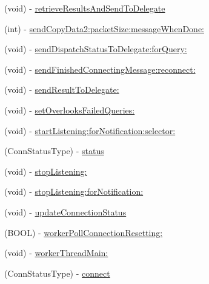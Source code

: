 \begin{DoxyCompactItemize}
\item 
(void) -\/ \hyperlink{interface_p_g_t_s_connection_a57a45776d9bde345c877f7126bf8d52d}{retrieve\+Results\+And\+Send\+To\+Delegate}
\item 
(int) -\/ \hyperlink{interface_p_g_t_s_connection_a4a7d18e07e3280f24111c371e435d9ab}{send\+Copy\+Data2\+:packet\+Size\+:message\+When\+Done\+:}
\item 
(void) -\/ \hyperlink{interface_p_g_t_s_connection_a51eb82fa2ff80b9cf0f1886b0ee5070b}{send\+Dispatch\+Status\+To\+Delegate\+:for\+Query\+:}
\item 
(void) -\/ \hyperlink{interface_p_g_t_s_connection_a05622f7428508a50ad60ca55337dbe06}{send\+Finished\+Connecting\+Message\+:reconnect\+:}
\item 
(void) -\/ \hyperlink{interface_p_g_t_s_connection_a367d97d8e4f3bfa8fb4ebd9c7a71f2bb}{send\+Result\+To\+Delegate\+:}
\item 
(void) -\/ \hyperlink{interface_p_g_t_s_connection_affcfc72eb15f19ee4e1952c26dc5c932}{set\+Overlooks\+Failed\+Queries\+:}
\item 
(void) -\/ \hyperlink{interface_p_g_t_s_connection_a08e48332bc55596af0a89cf22adb330d}{start\+Listening\+:for\+Notification\+:selector\+:}
\item 
(Conn\+Status\+Type) -\/ \hyperlink{interface_p_g_t_s_connection_abaf1ed2f2f5eb4bbfbe0e0e10bedcce8}{status}
\item 
(void) -\/ \hyperlink{interface_p_g_t_s_connection_a208653d3387913349df4a016233a9bc6}{stop\+Listening\+:}
\item 
(void) -\/ \hyperlink{interface_p_g_t_s_connection_a0d3f16a3e2b88553c47dc517198c20e0}{stop\+Listening\+:for\+Notification\+:}
\item 
(void) -\/ \hyperlink{interface_p_g_t_s_connection_a91c7654015e7c88ea13bd09fe7ab3b24}{update\+Connection\+Status}
\item 
(B\+O\+O\+L) -\/ \hyperlink{interface_p_g_t_s_connection_a3d97badebf597a33af3b652fc38d6ab9}{worker\+Poll\+Connection\+Resetting\+:}
\item 
(void) -\/ \hyperlink{interface_p_g_t_s_connection_aa8d37dc980297d7f6076e51e1807d460}{worker\+Thread\+Main\+:}
\end{DoxyCompactItemize}
{\bf }\par
\begin{DoxyCompactItemize}
\item 
(Conn\+Status\+Type) -\/ \hyperlink{interface_p_g_t_s_connection_a64ac04a9d2fb61a407ca6e463f673a79}{connect}
\end{DoxyCompactItemize}

